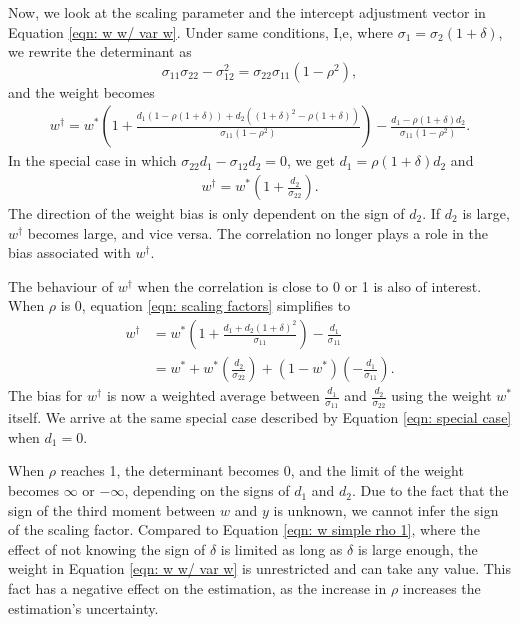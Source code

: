 \documentclass[11pt]{article}
\begin{document}
	Now, we look at the scaling parameter and the intercept adjustment vector in Equation \ref{eqn: w w/ var w}. Under same conditions, I,e, where
	\(\sigma_1 =\sigma_2 (1 + \delta)\), we rewrite the determinant as
	\begin{equation}
	\sigma_{11}\sigma_{22} - \sigma_{12}^2 = \sigma_{22}\sigma_{11} (1- \rho^2),
	\end{equation}
	and the weight becomes
	\begin{equation}
	\label{eqn: scaling factors}
	\begin{aligned}
	w^\dagger = w^*(1+\frac{d_1(1- \rho(1+\delta)) + d_2 ((1+\delta)^2-\rho(1+\delta))} {\sigma_{11} (1- \rho^2)}) - \frac{d_1-\rho(1+\delta) d_2}{\sigma_{11}(1- \rho^2)}.
	\end{aligned}
	\end{equation}
	In the special case in which $\sigma_{22} d_1 - \sigma_{12}d_2=0$, we get $d_1=\rho(1+\delta) d_2$ and 
	\begin{equation}
	\label{eqn: special case}
	\begin{aligned}
	w^\dagger = w^*(1+\frac{d_2} {\sigma_{22}}).
	\end{aligned}
	\end{equation}
	The direction of the weight bias is only dependent on the sign of $d_2$. If $d_2$ is large, $w^\dagger$ becomes large, and vice versa. The correlation no longer plays a role in the bias associated with $w^\dagger$.
	
	The behaviour of $w^\dagger$ when the correlation is close to 0 or 1 is also of interest. When $\rho$ is 0, equation \ref{eqn: scaling factors} simplifies to 
	\begin{equation}
	\label{eqn: scaling factor rho 0}
	\begin{aligned}
	w^\dagger &= w^*(1+\frac{d_1 + d_2 (1+\delta)^2} {\sigma_{11} }) - \frac{d_1}{\sigma_{11}}\\
	&=w^* +w^*(\frac{d_2}{\sigma_{22} }) + (1-w^*)(-\frac{d_1}{\sigma_{11}}).
	\end{aligned}
	\end{equation}
	The bias for $w^\dagger$ is now a weighted average between $\frac{d_1}{\sigma_{11}}$ and $\frac{d_2}{\sigma_{22}}$ using the weight $w^*$ itself. We arrive at the same special case described by Equation \ref{eqn: special case} when $d_1=0$.
	
	When $\rho$ reaches 1, the determinant becomes 0, and the limit of the weight becomes $\infty$ or $-\infty$, depending on the signs of $d_1$ and $d_2$. Due to the fact that the sign of the third moment between $w$ and $y$ is unknown, we cannot infer the sign of the scaling factor. Compared to Equation \ref{eqn: w simple rho 1}, where the effect of not knowing the sign of $\delta$ is limited as long as $\delta$ is large enough, the weight in Equation \ref{eqn: w w/ var w} is unrestricted and can take any value. This fact has a negative effect on the estimation, as the increase in $\rho$ increases the estimation's uncertainty.
	
\end{document}
